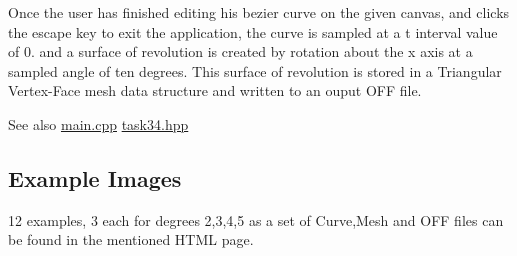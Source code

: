Once the user has finished editing his bezier curve on the given canvas, and clicks the escape key to exit the application, the curve is sampled at a t interval value of 0. and a surface of revolution is created by rotation about the x axis at a sampled angle of ten degrees. This surface of revolution is stored in a Triangular Vertex-\/\+Face mesh data structure and written to an ouput O\+FF file. \begin{DoxySeeAlso}{See also}
\hyperlink{main_8cpp}{main.\+cpp} \hyperlink{task34_8hpp}{task34.\+hpp}
\end{DoxySeeAlso}
\hypertarget{index_extra_algos}{}\subsection{Example Images}\label{index_extra_algos}
12 examples, 3 each for degrees 2,3,4,5 as a set of Curve,Mesh and O\+FF files can be found in the mentioned H\+T\+ML page. 